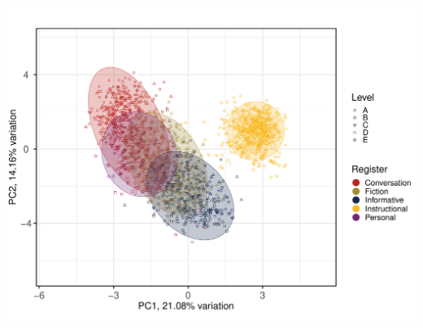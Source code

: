 \documentclass[
  letterpaper,
  DIV=11,
  numbers=noendperiod]{scrreprt}
\begin{document}
\includegraphics{E_Ch6_Analysis_files/figure-pdf/PCAtools-biplots-TxB-1.pdf}
\end{document}

